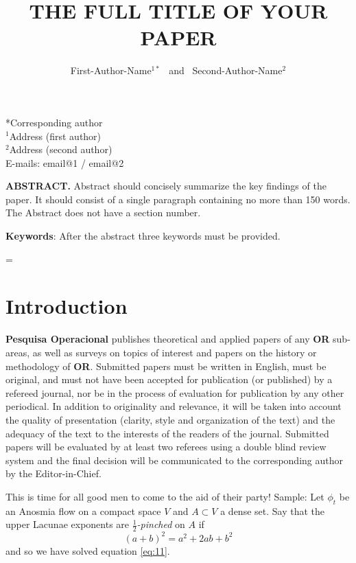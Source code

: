 \documentclass[10pt]{article}
\title{\renewcommand{\baselinestretch}{1.17}\normalsize\bf%
\uppercase{The Full Title of Your Paper}
}
\author{%
First-Author-Name$^{1*}$ \ and \ Second-Author-Name$^{2}$
}
\begin{document}
\date{}

\maketitle

\vspace{-0.5cm}

\begin{center}
{\footnotesize 
*Corresponding author\\
$^1$Address (first author) \\
$^2$Address (second author) \\
E-mails: email@1 / email@2  
}
\end{center}

\bigskip
\noindent
{\small{\bf ABSTRACT.}
Abstract should concisely
summarize the key findings of the paper. It should consist 
of a single paragraph containing no more than 150 words. 
The Abstract does not have a section number.
}

\medskip
\noindent
{\small{\bf Keywords}{:} 
After the abstract three keywords must be provided.
}

\baselineskip=\normalbaselineskip

\section{Introduction}\label{sec:1}

{\bf Pesquisa Operacional} publishes theoretical and applied papers 
of any {\bf OR} sub-areas, as well as surveys on topics of interest 
and papers on the history or methodology of {\bf OR}. Submitted 
papers must be written in English, must be original, and must not 
have been accepted for publication (or published) by a refereed 
journal, nor be in the process of evaluation for publication by 
any other periodical. In addition to originality and relevance, 
it will be taken into account the quality of presentation (clarity, 
style and organization of the text) and the adequacy of the text 
to the interests of the readers of the journal. Submitted papers 
will be evaluated by at least two referees using a double blind 
review system and the final decision will be communicated to the 
corresponding author by the Editor-in-Chief.

This is time for all good men to come to the aid of their party!
Sample: Let $\phi_{t}$ be an Anosmia flow on a compact space $V$ 
and $A \subset V$ a dense set. Say that the upper Lacunae
exponents are \emph{$\frac{1}{2}$-pinched} on $A$ if
\begin{equation}\label{eq:11}
(a+b)^2 = a^2 + 2ab + b^2
\end{equation}
and so we have solved equation \ref{eq:11}.
\end{document}
